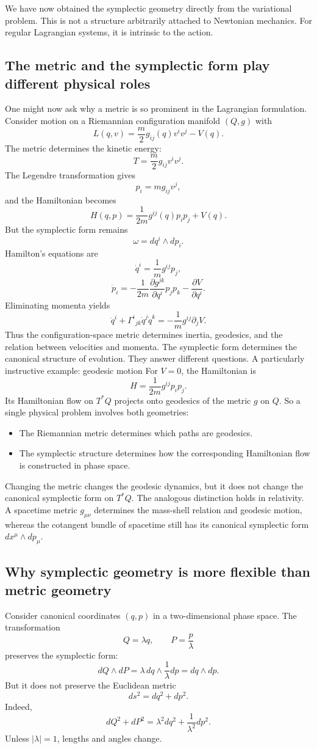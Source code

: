 We have now obtained the symplectic geometry directly from the variational
problem. This is not a structure arbitrarily attached to Newtonian mechanics.
For regular Lagrangian systems, it is intrinsic to the action.

\subsection{ The metric and the symplectic form play different physical roles}
One might now ask why a metric is so prominent in the Lagrangian formulation.
Consider motion on a Riemannian configuration manifold \((Q,g)\) with
\[
L(q,v)=\frac m2g_{ij}(q)v^iv^j-V(q).
\]
The metric determines the kinetic energy:
\[
T=\frac m2g_{ij}v^iv^j.
\]
The Legendre transformation gives
\[
p_i=mg_{ij}v^j,
\]
and the Hamiltonian becomes
\[
\boxed{
H(q,p)=\frac{1}{2m}g^{ij}(q)p_ip_j+V(q).
}
\]
But the symplectic form remains
\[
\boxed{\omega=dq^i\wedge dp_i.}
\]
Hamilton's equations are
\[
\dot q^i=\frac1m g^{ij}p_j,
\]
\[
\dot p_i
=-\frac{1}{2m}\frac{\partial g^{jk}}{\partial q^i}p_jp_k
-\frac{\partial V}{\partial q^i}.
\]
Eliminating momenta yields
\[
\boxed{
\ddot q^i+\Gamma^i{}_{jk}\dot q^j\dot q^k
=-\frac1m g^{ij}\partial_jV.
}
\]
Thus the configuration-space metric determines inertia, geodesics, and the
relation between velocities and momenta.
The symplectic form determines the canonical structure of evolution.
They answer different questions.
A particularly instructive example: geodesic motion
For \(V=0\), the Hamiltonian is
\[
H=\frac1{2m}g^{ij}p_ip_j.
\]
Its Hamiltonian flow on \(T^*Q\) projects onto geodesics of the metric \(g\) on
\(Q\).
So a single physical problem involves both geometries:
\begin{itemize}
\item The Riemannian metric determines which paths are geodesics.
\item The symplectic structure determines how the corresponding Hamiltonian
    flow is constructed in phase space.
\end{itemize}
Changing the metric changes the geodesic dynamics, but it does not change the
canonical symplectic form on \(T^*Q\). The analogous distinction holds in
relativity. A spacetime metric \(g_{\mu\nu}\) determines the mass-shell
relation and geodesic motion, whereas the cotangent bundle of spacetime still
has its canonical symplectic form \(dx^\mu\wedge dp_\mu\).

\subsection{ Why symplectic geometry is more flexible than metric geometry}
Consider canonical coordinates \((q,p)\) in a two-dimensional phase space.
The transformation
\[
\boxed{
Q=\lambda q,\qquad P=\frac p\lambda
}
\]
preserves the symplectic form:
\[
dQ\wedge dP
=\lambda\,dq\wedge\frac1\lambda dp
=dq\wedge dp.
\]
But it does not preserve the Euclidean metric
\[
ds^2=dq^2+dp^2.
\]
Indeed,
\[
dQ^2+dP^2
=\lambda^2dq^2+\frac1{\lambda^2}dp^2.
\]
Unless \(|\lambda|=1\), lengths and angles change.

